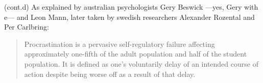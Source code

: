 \documentclass{screenplay}[2018/01/07]
\begin{document}

    \begin{dialogue}{(cont.d)}
        As explained by australian psychologists Gery Beswick —yes, Gery with e—
        and Leon Mann, later taken by swedish researchers Alexander Rozental and
        Per Carlbring:
        \begin{quote}
            Procrastination is a pervasive self-regulatory failure affecting
            approximately one-fifth of the adult population and half of the
            student population. It is defined as one's voluntarily delay of an
            intended course of action despite being worse off as a result of
            that delay.
        \end{quote}\citet{rozental2014}
    \end{dialogue}
    \fadeout

    \theend

    \pagebreak
    
    
\end{document}
